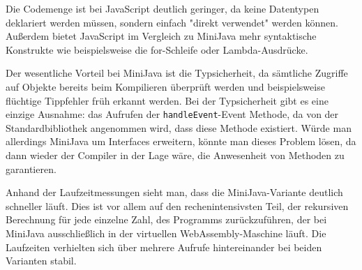 Die Codemenge ist bei JavaScript deutlich geringer, da keine Datentypen deklariert werden müssen, sondern einfach "direkt verwendet" werden können. Außerdem bietet JavaScript im Vergleich zu MiniJava mehr syntaktische Konstrukte wie beispielsweise die for-Schleife oder Lambda-Ausdrücke. 

Der wesentliche Vorteil bei MiniJava ist die Typsicherheit, da sämtliche Zugriffe auf Objekte bereits beim Kompilieren überprüft werden und beispielsweise flüchtige Tippfehler früh erkannt werden. Bei der Typsicherheit gibt es eine einzige Ausnahme: das Aufrufen der \lstinline{handleEvent}-Event Methode, da von der Standardbibliothek angenommen wird, dass diese Methode existiert. Würde man allerdings MiniJava um Interfaces erweitern, könnte man dieses Problem lösen, da dann wieder der Compiler in der Lage wäre, die Anwesenheit von Methoden zu garantieren.

Anhand der Laufzeitmessungen sieht man, dass die MiniJava-Variante deutlich schneller läuft. Dies ist vor allem auf den rechenintensivsten Teil, der rekursiven Berechnung für jede einzelne Zahl, des Programms zurückzuführen, der bei MiniJava ausschließlich in der virtuellen WebAssembly-Maschine läuft. Die Laufzeiten verhielten sich über mehrere Aufrufe hintereinander bei beiden Varianten stabil.
